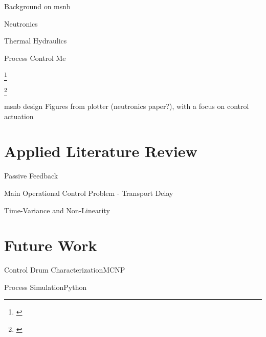 \documentclass[aspectratio=1610,pdftex,dvipsnames]{beamer}
\newcommand\blfootnote[1]{%
  \begingroup
  \renewcommand\thefootnote{}\footnote{#1}%
  \addtocounter{footnote}{-1}%
  \endgroup
}
\newcommand{\acs}{\acrshort} %
\begin{document}
\begin{frame}{Background on \acs{msnb}}
    \begin{block}{Neutronics}
        \cite{PetersonMS}
    \end{block}
    
    \begin{block}{Thermal Hydraulics}
        \cite{CarterPHD}
    \end{block}
    
    \begin{block}{Process Control}
        Me
    \end{block}

    \blfootnote{\tiny\cite{CarterPHD} \tiny{}}
    \blfootnote{\tiny\cite{PetersonMS} \tiny{}}
\end{frame}

\begin{frame}{\acs{msnb} design}
    Figures from plotter (neutronics paper?), with a focus on control actuation
\end{frame}

\section{Applied Literature Review}

\begin{frame}{Passive Feedback}
    
\end{frame}

\begin{frame}{Main Operational Control Problem - Transport Delay}
    
\end{frame}

\begin{frame}{Time-Variance and Non-Linearity}
    
\end{frame}

\section{Future Work}

\begin{frame}{Control Drum Characterization}{MCNP}
    
\end{frame}

\begin{frame}{Process Simulation}{Python}
    
\end{frame}
\end{document}
